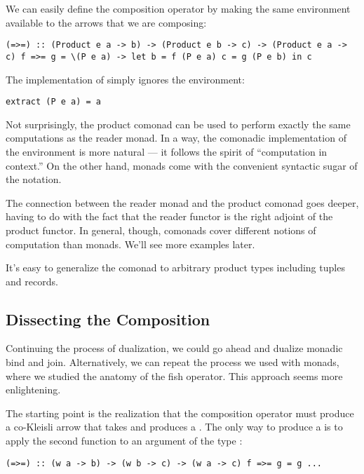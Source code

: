 We can easily define the composition operator by making the same
environment available to the arrows that we are composing:

\begin{verbatim}
(=>=) :: (Product e a -> b) -> (Product e b -> c) -> (Product e a -> c) f =>= g = \(P e a) -> let b = f (P e a) c = g (P e b) in c
\end{verbatim}

The implementation of  simply ignores the environment:

\begin{verbatim}
extract (P e a) = a
\end{verbatim}

Not surprisingly, the product comonad can be used to perform exactly the
same computations as the reader monad. In a way, the comonadic
implementation of the environment is more natural --- it follows the
spirit of ``computation in context.'' On the other hand, monads come
with the convenient syntactic sugar of the  notation.

The connection between the reader monad and the product comonad goes
deeper, having to do with the fact that the reader functor is the right
adjoint of the product functor. In general, though, comonads cover
different notions of computation than monads. We'll see more examples
later.

It's easy to generalize the  comonad to arbitrary
product types including tuples and records.

\subsection{Dissecting the
Composition}\label{dissecting-the-composition}

Continuing the process of dualization, we could go ahead and dualize
monadic bind and join. Alternatively, we can repeat the process we used
with monads, where we studied the anatomy of the fish operator. This
approach seems more enlightening.

The starting point is the realization that the composition operator must
produce a co-Kleisli arrow that takes  and produces a
. The only way to produce a  is to apply the second
function to an argument of the type :

\begin{verbatim}
(=>=) :: (w a -> b) -> (w b -> c) -> (w a -> c) f =>= g = g ... 
\end{verbatim}

